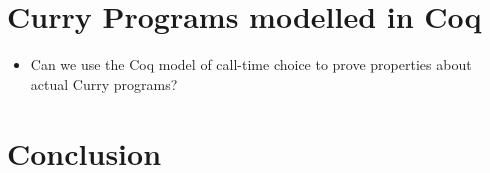 \documentclass[a4paper, 11pt, fleqn, twoside]{scrreprt}
\begin{document}
\chapter{Curry Programs modelled in Coq}
\begin{itemize}
\item Can we use the Coq model of call-time choice to prove properties about 
actual Curry programs?
\end{itemize}

\chapter{Conclusion}



\appendix
\end{document}
